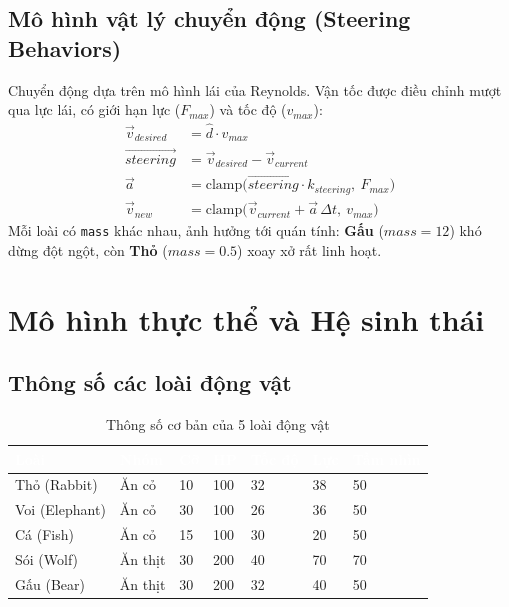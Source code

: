 \documentclass[12pt,a4paper]{report}
\newcommand{\code}[1]{\texttt{\small #1}}
\begin{document}
\section{Mô hình vật lý chuyển động (Steering Behaviors)}

Chuyển động dựa trên mô hình lái của Reynolds. Vận tốc được điều chỉnh mượt qua lực lái, có giới hạn lực ($F_{max}$) và tốc độ ($v_{max}$):
\begin{align}
\vec{v}_{desired} &= \hat{d}\cdot v_{max} \\
\vec{steering}    &= \vec{v}_{desired} - \vec{v}_{current} \\
\vec{a}           &= \mathrm{clamp}\big(\vec{steering}\cdot k_{steering},\ F_{max}\big) \\
\vec{v}_{new}     &= \mathrm{clamp}\big(\vec{v}_{current} + \vec{a}\,\Delta t,\ v_{max}\big)
\end{align}
Mỗi loài có \code{mass} khác nhau, ảnh hưởng tới quán tính: \textbf{Gấu} ($mass=12$) khó dừng đột ngột, còn \textbf{Thỏ} ($mass=0.5$) xoay xở rất linh hoạt.

\chapter{Mô hình thực thể và Hệ sinh thái}

\section{Thông số các loài động vật}

\begin{table}[H]
\centering
\caption{Thông số cơ bản của 5 loài động vật}
\begin{tabular}{L{2.1cm} C{1.9cm} C{1.1cm} C{1cm} C{1.5cm} C{1.4cm} C{1.6cm}}
\toprule
{}
\textcolor{white}{\textbf{Loài}} &
\textcolor{white}{\textbf{Nhóm}} &
\textcolor{white}{\textbf{Cỡ}} &
\textcolor{white}{\textbf{HP}} &
\textcolor{white}{\textbf{Tốc độ}} &
\textcolor{white}{\textbf{Lực}} &
\textcolor{white}{\textbf{Tầm nhìn}} \\
\midrule
Thỏ (Rabbit) & Ăn cỏ & 10 & 100 & 32 & 38 & 50 \\
 Voi (Elephant) & Ăn cỏ & 30 & 100 & 26 & 36 & 50 \\
Cá (Fish) & Ăn cỏ & 15 & 100 & 30 & 20 & 50 \\
 Sói (Wolf) & Ăn thịt & 30 & 200 & 40 & 70 & 70 \\
Gấu (Bear) & Ăn thịt & 30 & 200 & 32 & 40 & 50 \\
\bottomrule
\end{tabular}
\end{table}
\end{document}

